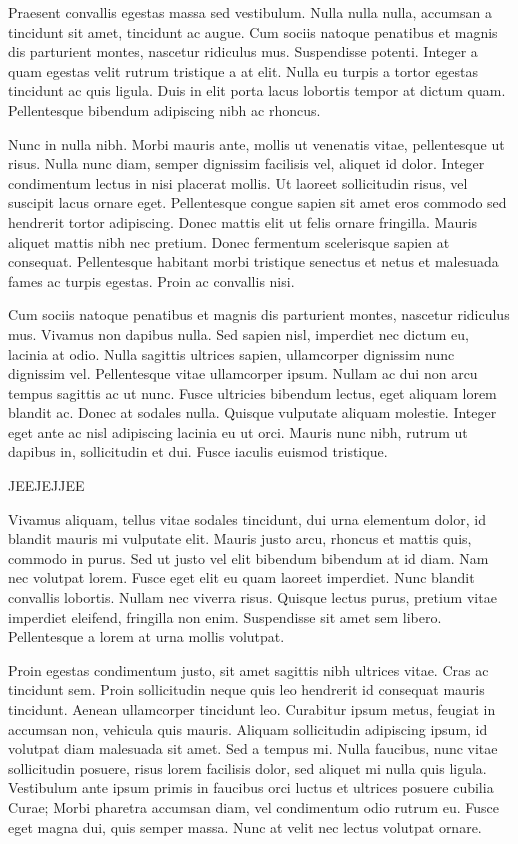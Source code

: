 \documentclass[a4paper]{article}
\begin{document}
Praesent convallis egestas massa sed vestibulum. Nulla nulla nulla, accumsan a tincidunt sit amet, tincidunt ac augue. Cum sociis natoque penatibus et magnis dis parturient montes, nascetur ridiculus mus. Suspendisse potenti. Integer a quam egestas velit rutrum tristique a at elit. Nulla eu turpis a tortor egestas tincidunt ac quis ligula. Duis in elit porta lacus lobortis tempor at dictum quam. Pellentesque bibendum adipiscing nibh ac rhoncus.

Nunc in nulla nibh. Morbi mauris ante, mollis ut venenatis vitae, pellentesque ut risus. Nulla nunc diam, semper dignissim facilisis vel, aliquet id dolor. Integer condimentum lectus in nisi placerat mollis. Ut laoreet sollicitudin risus, vel suscipit lacus ornare eget. Pellentesque congue sapien sit amet eros commodo sed hendrerit tortor adipiscing. Donec mattis elit ut felis ornare fringilla. Mauris aliquet mattis nibh nec pretium. Donec fermentum scelerisque sapien at consequat. Pellentesque habitant morbi tristique senectus et netus et malesuada fames ac turpis egestas. Proin ac convallis nisi.

Cum sociis natoque penatibus et magnis dis parturient montes, nascetur ridiculus mus. Vivamus non dapibus nulla. Sed sapien nisl, imperdiet nec dictum eu, lacinia at odio. Nulla sagittis ultrices sapien, ullamcorper dignissim nunc dignissim vel. Pellentesque vitae ullamcorper ipsum. Nullam ac dui non arcu tempus sagittis ac ut nunc. Fusce ultricies bibendum lectus, eget aliquam lorem blandit ac. Donec at sodales nulla. Quisque vulputate aliquam molestie. Integer eget ante ac nisl adipiscing lacinia eu ut orci. Mauris nunc nibh, rutrum ut dapibus in, sollicitudin et dui. Fusce iaculis euismod tristique.

JEEJEJJEE

Vivamus aliquam, tellus vitae sodales tincidunt, dui urna elementum dolor, id blandit mauris mi vulputate elit. Mauris justo arcu, rhoncus et mattis quis, commodo in purus. Sed ut justo vel elit bibendum bibendum at id diam. Nam nec volutpat lorem. Fusce eget elit eu quam laoreet imperdiet. Nunc blandit convallis lobortis. Nullam nec viverra risus. Quisque lectus purus, pretium vitae imperdiet eleifend, fringilla non enim. Suspendisse sit amet sem libero. Pellentesque a lorem at urna mollis volutpat.

Proin egestas condimentum justo, sit amet sagittis nibh ultrices vitae. Cras ac tincidunt sem. Proin sollicitudin neque quis leo hendrerit id consequat mauris tincidunt. Aenean ullamcorper tincidunt leo. Curabitur ipsum metus, feugiat in accumsan non, vehicula quis mauris. Aliquam sollicitudin adipiscing ipsum, id volutpat diam malesuada sit amet. Sed a tempus mi. Nulla faucibus, nunc vitae sollicitudin posuere, risus lorem facilisis dolor, sed aliquet mi nulla quis ligula. Vestibulum ante ipsum primis in faucibus orci luctus et ultrices posuere cubilia Curae; Morbi pharetra accumsan diam, vel condimentum odio rutrum eu. Fusce eget magna dui, quis semper massa. Nunc at velit nec lectus volutpat ornare.
\end{document}
